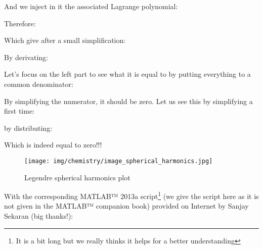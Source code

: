 	And we inject in it the associated Lagrange polynomial:
	
	Therefore:
	
	Which give after a small simplification:
	
	By derivating:
	
	Let's focus on the left part to see what it is equal to by putting everything to a common denominator:
	
	By simplifying the numerator, it should be zero. Let us see this by simplifying a first time:
	
	by distributing:
	
	Which is indeed equal to zero!!!
 	\begin{figure}[H]
		\centering
		\texttt{[image: img/chemistry/image\_spherical\_harmonics.jpg]}	
		\caption{Legendre spherical harmonics plot}
	\end{figure}
	With the corresponding MATLAB™ 2013a script\footnote{It is a bit long but we really thinks it helps for a better understanding} (we give the script here as it is not given in the MATLAB™ companion book) provided on Internet by Sanjay Sekaran (big thanks!):
